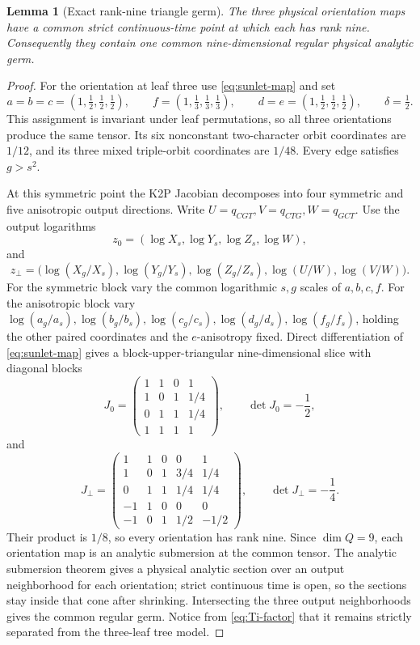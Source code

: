 \documentclass[11pt]{article}
\newtheorem{lemma}[theorem]{Lemma}
\theoremstyle{remark}
\newcommand{\1}{\mathbf 1}
\begin{document}
\begin{lemma}[Exact rank-nine triangle germ]\label{lem:triangle-germ}
The three physical orientation maps have a common strict continuous-time
point at which each has rank nine.  Consequently they contain one common
nine-dimensional regular physical analytic germ.
\end{lemma}

\begin{proof}
For the orientation at leaf three use \eqref{eq:sunlet-map} and set
\[
 a=b=c=(1,\tfrac12,\tfrac12,\tfrac12),\qquad
 f=(1,\tfrac13,\tfrac13,\tfrac13),\qquad
 d=e=(1,\tfrac12,\tfrac12,\tfrac12),\qquad
 \delta=\tfrac12.
\]
This assignment is invariant under leaf permutations, so all three
orientations produce the same tensor.  Its six nonconstant two-character
orbit coordinates are \(1/12\), and its three mixed triple-orbit coordinates
are \(1/48\).  Every edge satisfies \(g>s^2\).

At this symmetric point the K2P Jacobian decomposes into four symmetric and
five anisotropic output directions.  Write
\(U=q_{CGT},V=q_{CTG},W=q_{GCT}\).  Use the output logarithms
\[
 z_0=(\log X_s,\log Y_s,\log Z_s,\log W),
\]
and
\[
 z_\perp=\bigl(\log(X_g/X_s),\log(Y_g/Y_s),\log(Z_g/Z_s),
               \log(U/W),\log(V/W)\bigr).
\]
For the symmetric block vary the common logarithmic \(s,g\) scales of
\(a,b,c,f\).  For the anisotropic block vary
\(\log(a_g/a_s),\log(b_g/b_s),\log(c_g/c_s),
\log(d_g/d_s),\log(f_g/f_s)\), holding the other paired coordinates and the
\(e\)-anisotropy fixed.  Direct differentiation of \eqref{eq:sunlet-map}
gives a block-upper-triangular nine-dimensional slice with diagonal blocks
\[
 J_0=\begin{pmatrix}
 1&1&0&1\\
 1&0&1&1/4\\
 0&1&1&1/4\\
 1&1&1&1
 \end{pmatrix},\qquad \det J_0=-\frac12,
\]
and
\[
 J_\perp=\begin{pmatrix}
 1&1&0&0&1\\
 1&0&1&3/4&1/4\\
 0&1&1&1/4&1/4\\
 -1&1&0&0&0\\
 -1&0&1&1/2&-1/2
 \end{pmatrix},\qquad \det J_\perp=-\frac14.
\]
Their product is \(1/8\), so every orientation has rank nine.  Since
\(\dim Q=9\), each orientation map is an analytic submersion at the common
tensor.  The analytic submersion theorem gives a physical analytic section
over an output neighborhood for each orientation; strict continuous time is
open, so the sections stay inside that cone after shrinking.  Intersecting
the three output neighborhoods gives the common regular germ.  Notice from
\eqref{eq:Ti-factor} that it remains strictly separated from the three-leaf
tree model.
\end{proof}
\end{document}
